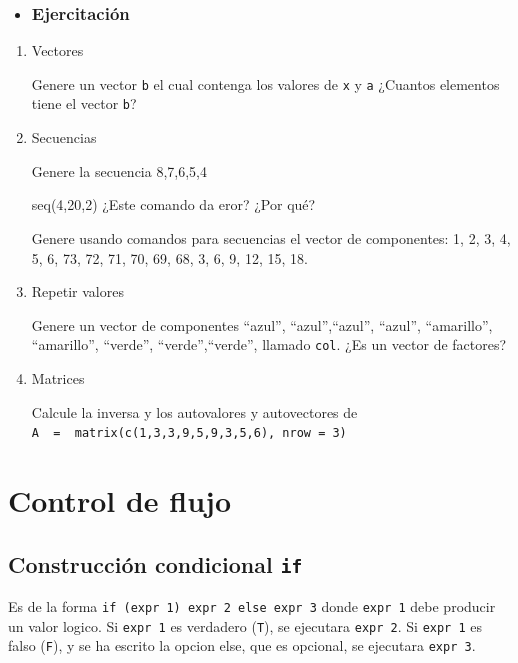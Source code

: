 \documentclass[]{book}
\newenvironment{rmdblock}[1]
{\begin{shaded*}
		\begin{itemize}
			\renewcommand{\labelitemi}{
				\raisebox{-.7\height}[0pt][0pt]{
					{\setkeys{Gin}{width=3em,keepaspectratio}\texttt{[image: images/\#1]}}
				}
			}
			\item
		}
		{
		\end{itemize}
	\end{shaded*}
}
\newenvironment{rmdtip}
{\begin{rmdblock}{tip}}
	{\end{rmdblock}}
\begin{document}
\begin{rmdtip}
\subsection{Ejercitación}\label{ejercitacion}
\end{rmdtip}

\begin{boxeda}
\begin{enumerate}
\def\labelenumi{\arabic{enumi}.}
\item
  Vectores

  Genere un vector \texttt{b} el cual contenga los valores de \texttt{x}
  y \texttt{a} ¿Cuantos elementos tiene el vector \texttt{b}?
\item
  Secuencias

  Genere la secuencia 8,7,6,5,4

  seq(4,20,2) ¿Este comando da eror? ¿Por qué?

  Genere usando comandos para secuencias el vector de componentes: 1, 2,
  3, 4, 5, 6, 73, 72, 71, 70, 69, 68, 3, 6, 9, 12, 15, 18.
\item
  Repetir valores

  Genere un vector de componentes ``azul'', ``azul'',``azul'', ``azul'',
  ``amarillo'', ``amarillo'', ``verde'', ``verde'',``verde'', llamado
  \texttt{col}. ¿Es un vector de factores?
\item
  Matrices

  Calcule la inversa y los autovalores y autovectores de
  \texttt{A\ \ =\ \ matrix(c(1,3,3,9,5,9,3,5,6),\ nrow\ =\ 3)}
\end{enumerate}
\end{boxeda}

\chapter{Control de flujo}\label{control-de-flujo}

\section{\texorpdfstring{Construcción condicional
\texttt{if}}{Construcción condicional if}}\label{construccion-condicional-if}

Es de la forma \texttt{if\ (expr\ 1)\ expr\ 2\ else\ expr\ 3} donde
\texttt{expr\ 1} debe producir un valor logico. Si \texttt{expr\ 1} es
verdadero (\texttt{T}), se ejecutara \texttt{expr\ 2}. Si
\texttt{expr\ 1} es falso (\texttt{F}), y se ha escrito la opcion else,
que es opcional, se ejecutara \texttt{expr\ 3}.
\end{document}
